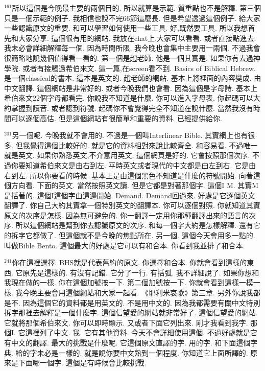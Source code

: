 \documentclass{book}
\begin{document}
$^{161}$所以這個是今晚最主要的兩個目的.
所以就算是示範.
質重點也不是解釋.
第三個只是一個示範的例子.
我相信也說不完66節這麼長.
但是希望透過這個例子.
給大家一些認識原文的重要.
和可以學習如何使用一些工具.
好,既然要工具.
所以我想首先和大家分享.
這個很有用的網站.
我放在chat上,大家可以看看.
或者直接點進去.
我未必會詳細解釋每一個.
因為時間所限.
我今晚也會集中主要用一兩個.
不過我會很簡略地說幾個值得看一看的.
第一個是趙老師.
他是一個其實是.
如果你有去過神學院.
或者有接觸過希伯來文.
這一篇,在screen看不到.
Basics of Biblical Hebrew.
是一個classical的書本.
這本是英文的.
趙老師的網站.
基本上將裡面的內容變成.
由中文翻譯.
這個網站是非常好的.
或者今晚我們也會看.
因為這個是字母詩.
基本上希伯來文22個字母都看完.
你說我不知道是什麼.
你可以進入字母表.
你起碼可以大約掌握到讀音.
或者認到符號.
起碼你不會覺得完全不知道在說什麼.
當然我沒有時間可以逐個高估.
但是這個網站有很簡單和重要的資料.
已經提供給你.

$^{201}$另一個呢.
今晚我就不會用的.
不過是一個叫Interlinear Bible.
其實網上也有很多.
但我覺得這個比較好的.
就是它的資料相對來說比較齊全.
和容易看.
不過唯一就是英文.
如果你熟悉英文,不介意用英文.
這個網頁是好的.
它會按照那個次序.
不過你要知道希伯來文是由右到左.
平時英文或者現代的中文都是由左到右.
它是由右到左.
所以你要看的時候.
基本上是由這個黑色不知道是什麼的符號開始.
向著這個方向看.
下面的英文.
當然按照英文讀.
但是它都是對著那個字.
這個I M.
其實M是括著的.
這個I這個字由這邊開始.
Demand.
Demand回過來.
好處是它逐個英文翻譯了.
你自己大約其實拿一個特別英文的翻譯本.
你可以逐個對照.
你就知道其實原文的次序是怎樣.
因為無可避免的.
你一翻譯一定用你那種翻譯出來的語言的次序.
所以這個網站是幫到你去認識原文的次序.
和每一個字大約是怎樣解釋.
還有它的拆字它都做了.
但這個就不是今晚的焦點所在.
另一個.
這個今天會用多一點的.
叫做Bible Bento.
這個最大的好處是它可以有和合本.
你看到我並排了和合本.

$^{241}$你在這裡選擇.
BHS就是代表舊約的原文.
你選擇和合本.
你就會看到這樣的東西.
它原先是這樣的.
有沒有記錯.
它分了一行.
有括弧.
我不詳細說了.
如果你想和我現在做的一樣.
你在這個加號按一下.
第二個加號按一下.
你就會看到這樣一模一樣.
我今晚主要會用這個網站和大家一起看.
《耶利米哀歌》第三章.
另外你說我都是不.
因為這個它的資料都是用英文的.
不是用中文的.
因為我都需要有關中文特別拆字那裡去解釋是一個什麼字.
這個信望愛的網站就非常好了.
這個信望愛的網站.
它就將那個希伯來文.
你可以即時顯示.
又或者下面它列出來.
剛才我看到我字.
那個I.
它這裡列了中文.
我.
它有其他資料.
今天不會詳細使用這個.
不過好處就是它有中文的翻譯.
最大的挑戰是什麼呢.
它這個原文直譯的字.
用的字.
和下面這個字典.
給的字未必是一樣的.
就是說你要中文熟到一個程度.
你知道它上面所譯的.
原來是下面哪一個字.
這個是有時候會比較挑戰.
\end{document}
